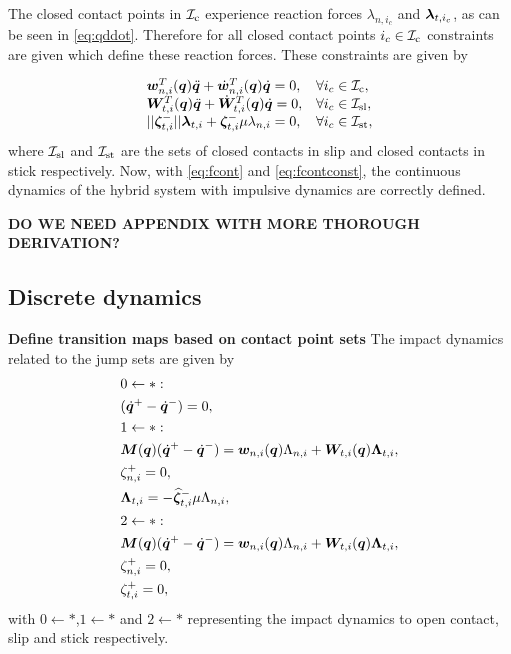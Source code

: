 \documentclass[../DC2017114Bouma.tex]{subfiles}
\begin{document}
The closed contact points in $\mathcal{I}_\text{c}$ experience reaction forces $\lambda_{n,i_c}$ and $\boldsymbol{\lambda}_{t,i_c}$, as can be seen in \eqref{eq:qddot}. Therefore for all closed contact points $i_c\in\mathcal{I}_\text{c}$ constraints are given which define these reaction forces. These constraints are given by

\begin{equation}
\begin{array}{ll}
{\boldsymbol{w}}^T_{n,i}({\boldsymbol{q}})\ddot{{\boldsymbol{q}}} + \dot{{\boldsymbol{w}}}^T_{n,i}({\boldsymbol{q}})\dot{{\boldsymbol{q}}} = 0, & \forall i_c\in\mathcal{I}_{\text{c}},\\
{\boldsymbol{W}}^T_{t,i}({\boldsymbol{q}})\ddot{{\boldsymbol{q}}} + \dot{{\boldsymbol{W}}}^T_{t,i}({\boldsymbol{q}})\dot{{\boldsymbol{q}}} = 0, & \forall i_c\in\mathcal{I}_{\text{sl}},\\
||\boldsymbol{\zeta}^-_{t,i}||\boldsymbol{\lambda}_{t,i} + \boldsymbol{\zeta}^-_{t,i}\mu\lambda_{n,i} = 0, & \forall i_c\in\mathcal{I}_{\text{st}},
\end{array}\label{eq:fcontconst}
\end{equation}
where $\mathcal{I}_{\text{sl}}$ and $\mathcal{I}_{\text{st}}$ are the sets of closed contacts in slip and closed contacts in stick respectively. Now, with \eqref{eq:fcont} and \eqref{eq:fcontconst}, the continuous dynamics of the hybrid system with impulsive dynamics are correctly defined.

\textbf{DO WE NEED APPENDIX WITH MORE THOROUGH DERIVATION?}

\subsection{Discrete dynamics}\label{sec:2discdyn}
\textbf{Define transition maps based on contact point sets}
The impact dynamics related to the jump sets are given by
\begin{align}
&0\leftarrow \ast:\nonumber\\
&(\dot{{\boldsymbol{q}}}^+ - \dot{{\boldsymbol{q}}}^-) = 0,\label{eq:appjump1}\\
&1\leftarrow\ast:\nonumber\\
&{\boldsymbol{M}}({\boldsymbol{q}})(\dot{{\boldsymbol{q}}}^+ - \dot{{\boldsymbol{q}}}^-) = {\boldsymbol{w}}_{n,i}({\boldsymbol{q}})\Lambda_{n,i} + {\boldsymbol{W}}_{t,i}({\boldsymbol{q}})\boldsymbol{\Lambda}_{t,i},\label{eq:appjump2}\\
&\zeta_{n,i}^+=0,\label{eq:appjump3}\\
&\boldsymbol{\Lambda}_{t,i} = -\widehat{\boldsymbol{\zeta}}^-_{t,i}\mu\Lambda_{n,i},\label{eq:appjump4}\\
&2\leftarrow \ast:\nonumber\\
&{\boldsymbol{M}}({\boldsymbol{q}})(\dot{{\boldsymbol{q}}}^+ - \dot{{\boldsymbol{q}}}^-) = {\boldsymbol{w}}_{n,i}({\boldsymbol{q}})\Lambda_{n,i} + {\boldsymbol{W}}_{t,i}({\boldsymbol{q}})\boldsymbol{\Lambda}_{t,i},\label{eq:appjump5}\\
&\zeta_{n,i}^+=0,\label{eq:appjump6}\\
&\zeta_{t,i}^+= 0,\label{eq:appjump7}
\end{align}
with $0\leftarrow\ast$,$1\leftarrow\ast$ and $2\leftarrow\ast$ representing the impact dynamics to open contact, slip and stick respectively. 
\end{document}
